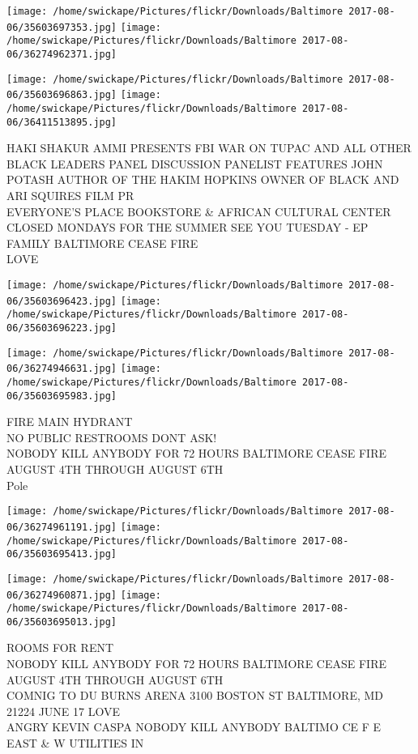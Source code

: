 \documentclass[10pt,letterpaper]{article}
\begin{document}
\texttt{[image: /home/swickape/Pictures/flickr/Downloads/Baltimore 2017-08-06/35603697353.jpg]}
\texttt{[image: /home/swickape/Pictures/flickr/Downloads/Baltimore 2017-08-06/36274962371.jpg]}

\texttt{[image: /home/swickape/Pictures/flickr/Downloads/Baltimore 2017-08-06/35603696863.jpg]}
\texttt{[image: /home/swickape/Pictures/flickr/Downloads/Baltimore 2017-08-06/36411513895.jpg]}

HAKI SHAKUR AMMI PRESENTS FBI WAR ON TUPAC AND ALL OTHER BLACK LEADERS PANEL DISCUSSION PANELIST FEATURES JOHN POTASH AUTHOR OF THE HAKIM HOPKINS OWNER OF BLACK AND ARI SQUIRES FILM PR\\
EVERYONE'S PLACE BOOKSTORE \& AFRICAN CULTURAL CENTER\\
CLOSED MONDAYS FOR THE SUMMER SEE YOU TUESDAY {-} EP FAMILY BALTIMORE CEASE FIRE\\
LOVE
\pagebreak

\texttt{[image: /home/swickape/Pictures/flickr/Downloads/Baltimore 2017-08-06/35603696423.jpg]}
\texttt{[image: /home/swickape/Pictures/flickr/Downloads/Baltimore 2017-08-06/35603696223.jpg]}

\texttt{[image: /home/swickape/Pictures/flickr/Downloads/Baltimore 2017-08-06/36274946631.jpg]}
\texttt{[image: /home/swickape/Pictures/flickr/Downloads/Baltimore 2017-08-06/35603695983.jpg]}

FIRE MAIN HYDRANT\\
NO PUBLIC RESTROOMS DONT ASK!\\
NOBODY KILL ANYBODY FOR 72 HOURS BALTIMORE CEASE FIRE AUGUST 4TH THROUGH AUGUST 6TH\\
Pole
\pagebreak

\texttt{[image: /home/swickape/Pictures/flickr/Downloads/Baltimore 2017-08-06/36274961191.jpg]}
\texttt{[image: /home/swickape/Pictures/flickr/Downloads/Baltimore 2017-08-06/35603695413.jpg]}

\texttt{[image: /home/swickape/Pictures/flickr/Downloads/Baltimore 2017-08-06/36274960871.jpg]}
\texttt{[image: /home/swickape/Pictures/flickr/Downloads/Baltimore 2017-08-06/35603695013.jpg]}

ROOMS FOR RENT\\
NOBODY KILL ANYBODY FOR 72 HOURS BALTIMORE CEASE FIRE AUGUST 4TH THROUGH AUGUST 6TH\\
COMNIG TO DU BURNS ARENA 3100 BOSTON ST BALTIMORE, MD 21224 JUNE 17 LOVE\\
ANGRY KEVIN CASPA NOBODY KILL ANYBODY BALTIMO CE F E EAST \& W UTILITIES IN
\pagebreak
\end{document}
